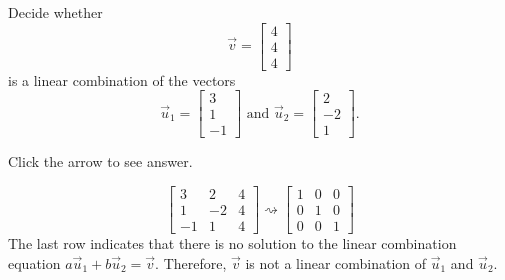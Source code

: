 \documentclass{ximera}
\begin{document}
\begin{problem}\label{prb:3.4}
Decide whether
$$
\vec{v}= 
\begin{bmatrix}
4 \\
4 \\
4
\end{bmatrix}
$$
is a linear combination of the vectors
$$
\vec{u}_1 = 
\begin{bmatrix}
3 \\
1 \\
-1
\end{bmatrix}
\mbox{ and  }
\vec{u}_2 =
\begin{bmatrix}
2 \\
-2\\
1
\end{bmatrix}.
$$

Click the arrow to see answer.

\begin{expandable}{}{}
$$\left[
\begin{array}{rr|r}
3 & 2 & 4 \\
1 & -2 & 4\\
-1 & 1 & 4
\end{array}
\right] \rightsquigarrow \left[
\begin{array}{rr|r}1& 0& 0\\
 0& 1 & 0\\
 0& 0& 1\end{array}
\right]$$
The last row indicates that there is no solution to the linear combination equation $a\vec{u}_1+b\vec{u}_2=\vec{v}$.  Therefore, $\vec{v}$ is not a linear combination of $\vec{u}_1$ and $\vec{u}_2$.
\end{expandable}
\end{problem}
\end{document}
